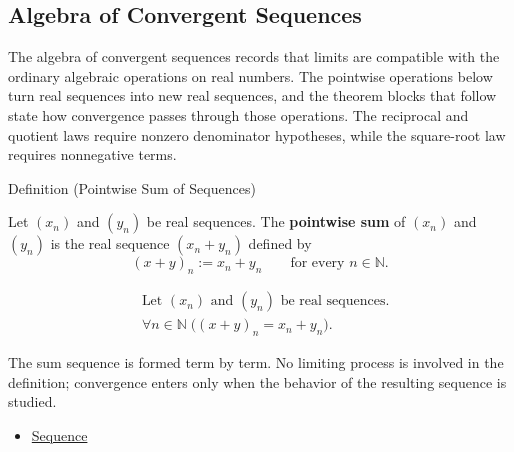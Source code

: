 \subsection*{Algebra of Convergent Sequences}

\begin{exposition}
The algebra of convergent sequences records that limits are compatible with the
ordinary algebraic operations on real numbers. The pointwise operations below
turn real sequences into new real sequences, and the theorem blocks that follow
state how convergence passes through those operations. The reciprocal and
quotient laws require nonzero denominator hypotheses, while the square-root
law requires nonnegative terms.
\end{exposition}


\begin{definitionbox}{Definition (Pointwise Sum of Sequences)}
\begin{definition}
\label{def:pointwise-sum-sequence}
Let $(x_n)$ and $(y_n)$ be real sequences. The \textbf{pointwise sum}
of $(x_n)$ and $(y_n)$ is the real sequence $(x_n+y_n)$ defined by
\[
(x+y)_n := x_n+y_n
\qquad
\text{for every } n\in\mathbb{N}.
\]
\end{definition}
\end{definitionbox}

\begin{remark*}
\[
\begin{aligned}
&\text{Let } (x_n) \text{ and } (y_n) \text{ be real sequences.}\\
&\forall n\in\mathbb{N}\;\bigl((x+y)_n=x_n+y_n\bigr).
\end{aligned}
\]
\end{remark*}

\begin{remark*}[Interpretation]
The sum sequence is formed term by term. No limiting process is involved in
the definition; convergence enters only when the behavior of the resulting
sequence is studied.
\end{remark*}

\begin{dependencies}
\begin{itemize}
  \item \hyperref[def:sequence]{Sequence}
\end{itemize}
\end{dependencies}

